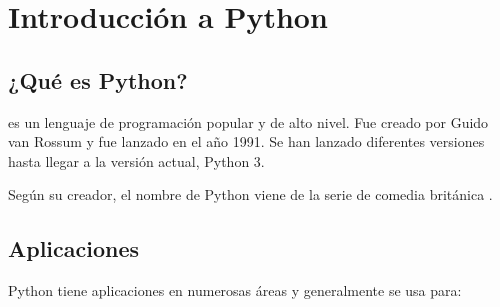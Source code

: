 \chapter{Introducción a Python}

\section{¿Qué es Python?}

 es un lenguaje de programación popular y de alto nivel.
Fue creado por Guido van Rossum y fue lanzado en el año 1991.
Se han lanzado diferentes versiones hasta llegar a la versión actual, Python 3.

Según su creador, el nombre de Python viene de la serie de comedia británica .

\section{Aplicaciones}

Python tiene aplicaciones en numerosas áreas y generalmente se usa para:

